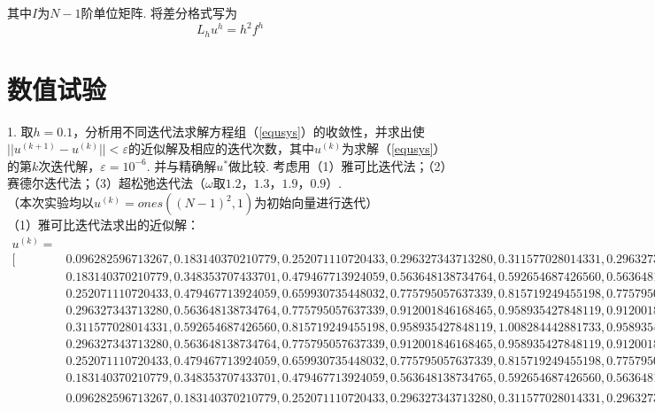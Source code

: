 \documentclass[10pt,a4paper]{article}
\begin{document}
其中$I$为$N-1$阶单位矩阵. 将差分格式写为
\begin{equation}
\label{equsys}
L_hu^h=h^2f^h
\end{equation}
\section{数值试验}
1. 取$h=0.1$，分析用不同迭代法求解方程组（\ref{equsys}）的收敛性，并求出使$||u^{(k+1)}-u^{(k)}||<\varepsilon$的近似解及相应的迭代次数，其中$u^{(k)}$为求解（\ref{equsys}）的第$k$次迭代解，$\varepsilon=10^{-6}$. 并与精确解$u^*$做比较. 考虑用（1）雅可比迭代法；（2）赛德尔迭代法；（3）超松弛迭代法（$\omega$取$1.2$，$1.3$，$1.9$，$0.9$）.\\
（本次实验均以$u^{(k)}=ones((N - 1)^2,1)$为初始向量进行迭代）\\
（1）雅可比迭代法求出的近似解：
\tiny
\begin{align*}
u^{(k)}=&\\
[&0.096282596713267,0.183140370210779,0.252071110720433,0.296327343713280,0.311577028014331,0.296327343713280,0.252071110720433,0.183140370210779,0.096282596713267,\\
&0.183140370210779,0.348353707433701,0.479467713924059,0.563648138734764,0.592654687426560,0.563648138734765,0.479467713924059,0.348353707433701,0.183140370210779,\\
&0.252071110720433,0.479467713924059,0.659930735448032,0.775795057637339,0.815719249455198,0.775795057637339,0.659930735448032,0.479467713924059,0.252071110720433,\\
&0.296327343713280,0.563648138734764,0.775795057637339,0.912001846168465,0.958935427848119,0.912001846168465,0.775795057637339,0.563648138734765,0.296327343713280,\\
&0.311577028014331,0.592654687426560,0.815719249455198,0.958935427848119,1.008284442881733,0.958935427848119,0.815719249455198,0.592654687426560,0.311577028014331,\\
&0.296327343713280,0.563648138734764,0.775795057637339,0.912001846168465,0.958935427848119,0.912001846168465,0.775795057637339,0.563648138734764,0.296327343713280,\\
&0.252071110720433,0.479467713924059,0.659930735448032,0.775795057637339,0.815719249455198,0.775795057637339,0.659930735448032,0.479467713924059,0.252071110720433,\\
&0.183140370210779,0.348353707433701,0.479467713924059,0.563648138734765,0.592654687426560,0.563648138734765,0.479467713924060,0.348353707433701,0.183140370210779,\\
&0.096282596713267,0.183140370210779,0.252071110720433,0.296327343713280,0.311577028014331,0.296327343713280,0.252071110720433,0.183140370210779,0.096282596713267]^T
\end{align*}
\end{document}

